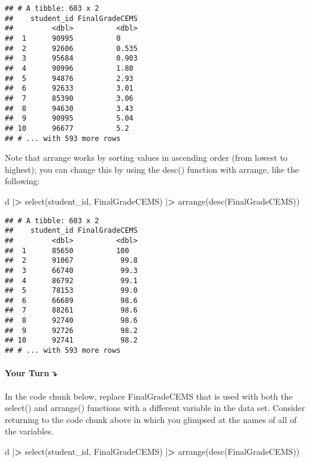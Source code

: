 \documentclass[
]{article}
\newenvironment{Shaded}{\begin{snugshade}}{\end{snugshade}}
\newcommand{\ErrorTok}[1]{\textcolor[rgb]{0.64,0.00,0.00}{\textbf{#1}}}
\newcommand{\FunctionTok}[1]{\textcolor[rgb]{0.00,0.00,0.00}{#1}}
\newcommand{\NormalTok}[1]{#1}
\newcommand{\SpecialCharTok}[1]{\textcolor[rgb]{0.00,0.00,0.00}{#1}}
\begin{document}
\begin{verbatim}
## # A tibble: 603 x 2
##    student_id FinalGradeCEMS
##         <dbl>          <dbl>
##  1      90995          0    
##  2      92606          0.535
##  3      95684          0.903
##  4      90996          1.80 
##  5      94876          2.93 
##  6      92633          3.01 
##  7      85390          3.06 
##  8      94630          3.43 
##  9      90995          5.04 
## 10      96677          5.2  
## # ... with 593 more rows
\end{verbatim}

Note that arrange works by sorting values in ascending order (from
lowest to highest); you can change this by using the desc() function
with arrange, like the following:

\begin{Shaded}
\begin{Highlighting}[]
\NormalTok{d }\SpecialCharTok{|}\ErrorTok{\textgreater{}} 
  \FunctionTok{select}\NormalTok{(student\_id, FinalGradeCEMS) }\SpecialCharTok{|}\ErrorTok{\textgreater{}} 
  \FunctionTok{arrange}\NormalTok{(}\FunctionTok{desc}\NormalTok{(FinalGradeCEMS))}
\end{Highlighting}
\end{Shaded}

\begin{verbatim}
## # A tibble: 603 x 2
##    student_id FinalGradeCEMS
##         <dbl>          <dbl>
##  1      85650          100  
##  2      91067           99.8
##  3      66740           99.3
##  4      86792           99.1
##  5      78153           99.0
##  6      66689           98.6
##  7      88261           98.6
##  8      92740           98.6
##  9      92726           98.2
## 10      92741           98.2
## # ... with 593 more rows
\end{verbatim}

\hypertarget{your-turn-4}{%
\paragraph{\texorpdfstring{{\textbf{Your Turn}}
\textbf{⤵}}{Your Turn ⤵}}\label{your-turn-4}}

In the code chunk below, replace FinalGradeCEMS that is used with both
the select() and arrange() functions with a different variable in the
data set. Consider returning to the code chunk above in which you
glimpsed at the names of all of the variables.

\begin{Shaded}
\begin{Highlighting}[]
\NormalTok{d }\SpecialCharTok{|}\ErrorTok{\textgreater{}} 
  \FunctionTok{select}\NormalTok{(student\_id, FinalGradeCEMS) }\SpecialCharTok{|}\ErrorTok{\textgreater{}} 
  \FunctionTok{arrange}\NormalTok{(}\FunctionTok{desc}\NormalTok{(FinalGradeCEMS))}
\end{Highlighting}
\end{Shaded}
\end{document}
